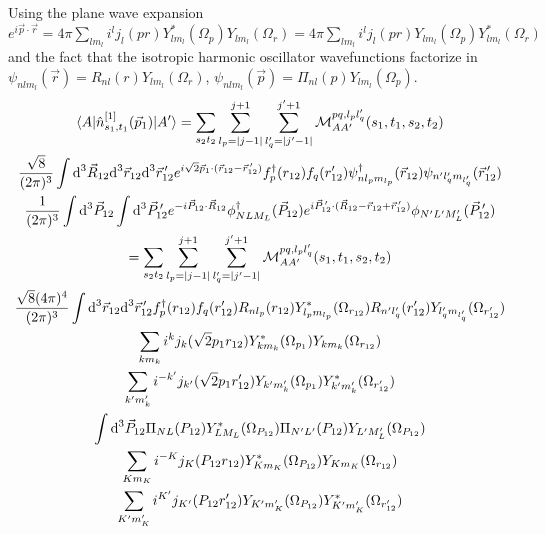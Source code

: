 \documentclass[10pt]{article}
\begin{document}
Using the plane wave expansion $e^{i \vec{p} \cdot \vec{r}} = 4 \pi \sum_{l m_l} i^{l} j_{l}(p r) Y_{l m_l}^{*}(\Omega_{p}) Y_{l m_l}(\Omega_{r}) = 4 \pi \sum_{l m_l} i^{l} j_{l}(p r) Y_{l m_l}(\Omega_{p}) Y_{l m_l}^{*}(\Omega_{r})$ and the fact that the isotropic harmonic oscillator wavefunctions factorize in $\psi_{n l m_l}(\vec{r}) = R_{n l}(r) Y_{l m_l}(\Omega_{r})$, $\psi_{n l m_l}(\vec{p}) = \Pi_{n l}(p) Y_{l m_l}(\Omega_{p})$.
\begin{multline*}
	\braket{ A | \hat{n}_{s_1,t_1}^{[1]}(\vec{p}_1) | A'} = \sum_{s_2 t_2}  \sum_{l_p = |j-1|}^{j+1} \sum_{l_q' = |j' - 1|}^{j'+1} \mathcal{M}_{AA'}^{p q,l_p l_q'}(s_1,t_1,s_2,t_2) \\
  \frac{\sqrt{8}}{(2 \pi)^{3}} \int \text{d}^{3} \vec{R}_{12} \text{d}^{3} \vec{r}_{12} \text{d}^{3} \vec{r}_{12}^{\, \prime}  e^{ i \sqrt{2} \vec{p}_{1} \cdot ( \vec{r}_{12} - \vec{r}_{12}^{\, \prime}) }  f_{p}^{\dagger}(r_{12}) f_{q}(r_{12}') \psi_{ n l_p m_{l_p}}^{\dagger}(\vec{r}_{12}) \psi_{ n' l_q' m_{l_q'}}(\vec{r}_{12}^{\, \prime})  \\
   \frac{1}{(2 \pi)^{3}} \int \text{d}^{3} \vec{P}_{12} \int \text{d}^{3} \vec{P}_{12}^{\, \prime} e^{ -i \vec{P}_{12} \cdot \vec{R}_{12}} \phi_{N L M_L}^{\dagger}(\vec{P}_{12}) e^{ i \vec{P}_{12}^{\, \prime} \cdot ( \vec{R}_{12} - \vec{r}_{12} + \vec{r}_{12}^{\, \prime})} \phi_{N' L' M_L'}(\vec{P}_{12}^{\, \prime}) \\
   = \sum_{s_2 t_2}  \sum_{l_p = |j-1|}^{j+1} \sum_{l_q' = |j' - 1|}^{j'+1} \mathcal{M}_{AA'}^{p q,l_p l_q'}(s_1,t_1,s_2,t_2) \\
    \frac{\sqrt{8} (4 \pi)^{4}}{(2 \pi)^{3}} \int \text{d}^{3} \vec{r}_{12} \text{d}^{3} \vec{r}_{12}^{\, \prime} f_{p}^{\dagger}(r_{12}) f_{q}(r_{12}')  R_{n l_p}(r_{12}) Y_{l_p m_{l_p}}^{*}(\Omega_{r_{12}}) R_{n' l_q'}(r_{12}') Y_{l_q' m_{l_q'}}(\Omega_{r_{12}'}) \\
   \sum_{k m_k} i^{k} j_{k}( \sqrt{2} p_1 r_{12}) Y_{k m_k}^{*}(\Omega_{p_1}) Y_{k m_k}(\Omega_{r_{12}}) \\
   \sum_{k' m_k'} i^{-k'} j_{k'}( \sqrt{2} p_1 r_{12}') Y_{k' m_k'}(\Omega_{p_1}) Y_{k' m_k'}^{*}(\Omega_{r_{12}'}) \\
   \int \text{d}^{3} \vec{P}_{12} \Pi_{N L}(P_{12}) Y_{L M_L}^{*}(\Omega_{P_{12}}) \Pi_{N' L'}(P_{12}) Y_{L' M_L'}(\Omega_{P_{12}})   \\
   \sum_{K m_K} i^{-K} j_{K}(P_{12} r_{12}) Y_{K m_K}^{*}(\Omega_{P_{12}}) Y_{K m_K}(\Omega_{r_{12}}) \\
   \sum_{K' m_K'} i^{K'} j_{K'}(P_{12} r_{12}') Y_{K' m_K'}(\Omega_{P_{12}}) Y_{K' m_K'}^{*}(\Omega_{r_{12}'}) \\
\end{multline*}
\end{document}
